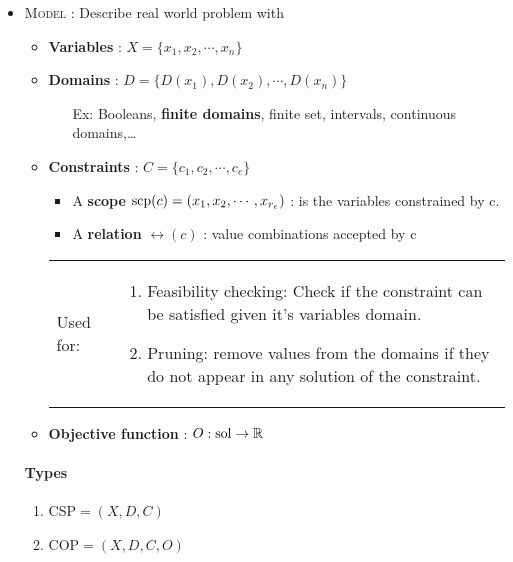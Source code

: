 \begin{itemize}
    \item \textsc{Model} : Describe real world problem with
        \begin{itemize}
            \item \textbf{Variables} : $X = \{x_1, x_2,\cdots, x_n\}$

            \item \textbf{Domains} : $D = \{ D(x_1), D(x_2),\cdots,
                D(x_n)\}$

                \begin{itemize}
                    \item[Ex:] Booleans, \textbf{finite domains}, finite
                        set, intervals, continuous domains,\ldots
                \end{itemize}
            \item \textbf{Constraints} : $C = \{c_1, c_2,\cdots, c_e\}$
                \begin{itemize}
                    \item A \textbf{scope} $\operatorname{scp}(c) = (x_1, x_2,\cdots,x_{r_e})$ : is the
                        variables constrained by c.
                    \item A \textbf{relation} $\rel(c)$ : value combinations accepted by
                        c
                \end{itemize}

                \begin{tabular}{m{1.5cm}m{12cm}}
                    Used for:&
                \begin{enumerate}
                    \item Feasibility checking: Check if the constraint can be satisfied
                        given it's variables domain. 

                    \item Pruning: remove values from the domains if they do not appear
                        in any solution of the constraint.
                \end{enumerate}
                \end{tabular}

            \item \textbf{Objective function} : $O : \operatorname{sol} \to \mathbb{R}$
        \end{itemize}

        \paragraph{Types}
        \begin{enumerate}
            \item CSP${} = (X, D, C)$
            \item COP${} = (X, D, C, O)$
        \end{enumerate}


\end{itemize}
